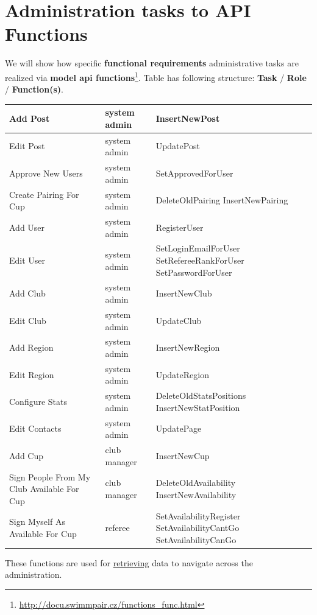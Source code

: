 \section {Administration tasks to API Functions}
We will show how specific \textbf{functional requirements} administrative tasks are realized via \textbf{model api functions}\footnote{\url{http://docu.swimmpair.cz/functions_func.html}}.
\newline
Table has following structure: \textbf{Task} / \textbf{Role} / \textbf{Function(s)}.
\newline
\begin{tabularx}{1.0\textwidth} { 
  | >{\raggedright\arraybackslash}X 
  | >{\centering\arraybackslash}X 
  | >{\raggedright\arraybackslash}X | }
 \hline
 Add Post & system admin& InsertNewPost \\
 \hline
 Edit Post  & system admin  & UpdatePost \\
 \hline
 Approve New Users & system admin & SetApprovedForUser \\
 \hline
 Create Pairing For Cup & system admin & DeleteOldPairing
InsertNewPairing\\
 \hline
 Add User & system admin & RegisterUser \\
 \hline
 Edit User & system admin &
 SetLoginEmailForUser
 SetRefereeRankForUser
 SetPasswordForUser\\
 \hline
 Add Club & system admin & InsertNewClub \\
 \hline
 Edit Club & system admin & UpdateClub \\
 \hline
 Add Region & system admin & InsertNewRegion \\
 \hline
 Edit Region & system admin & UpdateRegion \\
 \hline
 Configure Stats & system admin & DeleteOldStatsPositions
 InsertNewStatPosition \\
 \hline
 Edit Contacts & system admin & UpdatePage \\
 \hline
 Add Cup & club manager & InsertNewCup \\
 \hline
 Sign People From My Club Available For Cup & club manager & DeleteOldAvailability
 InsertNewAvailability \\
 \hline
 Sign Myself As Available For Cup & referee & SetAvailabilityRegister
 SetAvailabilityCantGo 
 SetAvailabilityCanGo \\
\hline
\end{tabularx}
These functions are used for \underline{retrieving} data to navigate across the administration.
